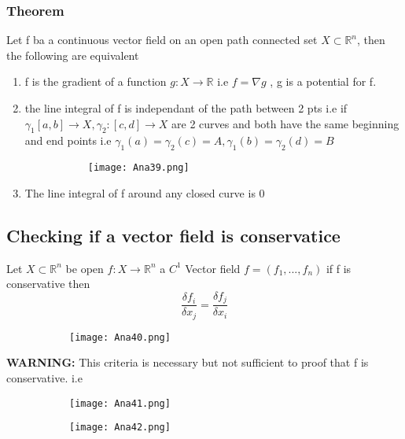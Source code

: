 \documentclass[8pt]{extreport}
\newcommand{\R}{\mathbb{R}}
\begin{document}
\subsubsection{Theorem}
Let f ba a continuous vector field on an open path connected set $X \subset \R^n$, then the following are equivalent
\begin{enumerate}
\item f is the gradient of a function $g:X \to \R$ i.e $f = \nabla g$ , g is a potential for f.
\item the line integral of f is independant of the path between 2 pts i.e if $\gamma_1 [a,b] \to X, \gamma_2:[c,d] \to X$ are 2 curves and both have the same beginning and end points i.e $\gamma_1(a) = \gamma_2(c) = A, \gamma_1(b) = \gamma_2(d) = B$
\begin{figure}[H]
\centering
\begin{subfigure}[b]{0.4\linewidth}
\texttt{[image: Ana39.png]}
\end{subfigure}
\end{figure}
\item The line integral of f around any closed curve is 0
\end{enumerate}

\subsection{Checking if a vector field is conservatice}

Let $X \subset \R^n$ be open $f : X \to \R^n$ a $C^1$ Vector field $f = (f_1,...,f_n)$ if f is conservative then 
$$ \frac{\delta f_i}{\delta x_j} = \frac{\delta f_j}{\delta x_i}$$
\begin{figure}[H]
\centering
\begin{subfigure}[b]{0.4\linewidth}
\texttt{[image: Ana40.png]}
\end{subfigure}
\end{figure}
\textbf{WARNING:} This criteria is necessary but not sufficient to proof that f is conservative. i.e
\begin{figure}[H]
\centering
\begin{subfigure}[b]{0.4\linewidth}
\texttt{[image: Ana41.png]}
\end{subfigure}
\begin{subfigure}[b]{0.4\linewidth}
\texttt{[image: Ana42.png]}
\end{subfigure}
\end{figure}
\end{document}
